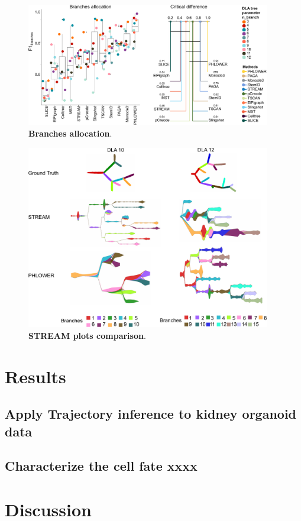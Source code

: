 \begin{figure}[!ht]
	\centering
	\includegraphics[width=0.95\textwidth]{F1branches/fig}
	\vspace{0.1cm}
	\caption[Branches allocation]{
	\textbf{Branches allocation}.}
	\label{fig:Cordist}
\end{figure}

\begin{figure}[!ht]
	\centering
	\includegraphics[width=0.95\textwidth]{PHLOWER_STREAM_layout/fig}
	\vspace{0.1cm}
	\caption[STREAM plots comparison]{
	\textbf{STREAM plots comparison}.}
	\label{fig:PHLOWER_STREAM}
\end{figure}



\section{Results}
\subsection{Apply Trajectory inference to kidney organoid data}
\subsection{Characterize the cell fate xxxx}

\section{Discussion}

